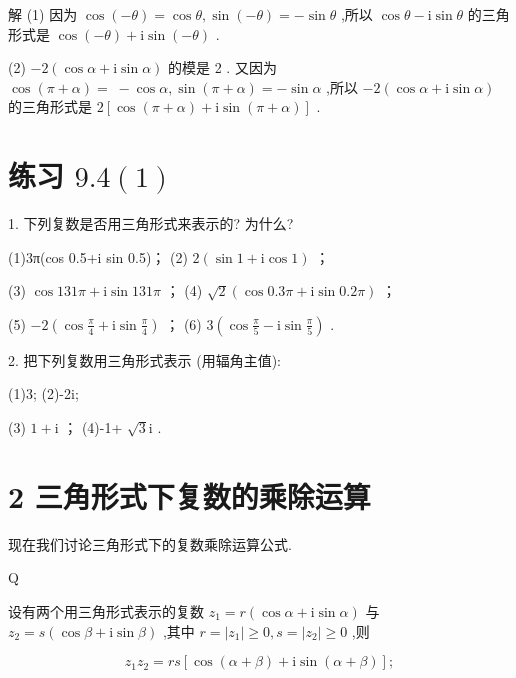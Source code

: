 \documentclass[10pt]{article}
\begin{document}
解 (1) 因为 \(\cos \left( {-\theta }\right)  = \cos \theta ,\sin \left( {-\theta }\right)  =  - \sin \theta\) ,所以 \(\cos \theta  - \mathrm{i}\sin \theta\) 的三角形式是 \(\cos \left( {-\theta }\right)  + \mathrm{i}\sin \left( {-\theta }\right)\) .

(2) \(- 2\left( {\cos \alpha  + \mathrm{i}\sin \alpha }\right)\) 的模是 2 . 又因为 \(\cos \left( {\pi  + \alpha }\right)  = \; - \cos \alpha ,\sin \left( {\pi  + \alpha }\right)  =  - \sin \alpha\) ,所以 \(- 2\left( {\cos \alpha  + \mathrm{i}\sin \alpha }\right)\) 的三角形式是 \(2\left\lbrack  {\cos \left( {\pi  + \alpha }\right)  + \mathrm{i}\sin \left( {\pi  + \alpha }\right) }\right\rbrack\) .

\section*{练习 \({9.4}\left( 1\right)\)}

1. 下列复数是否用三角形式来表示的? 为什么?

(1)3π(cos 0.5+i sin 0.5)； (2) \(2\left( {\sin 1 + \mathrm{i}\cos 1}\right)\) ；

(3) \(\cos {131\pi } + \mathrm{i}\sin {131\pi }\) ； (4) \(\sqrt{2}\left( {\cos {0.3\pi } + \mathrm{i}\sin {0.2\pi }}\right)\) ；

(5) \(- 2\left( {\cos \frac{\pi }{4} + \mathrm{i}\sin \frac{\pi }{4}}\right)\) ； (6) \(3\left( {\cos \frac{\pi }{5} - \mathrm{i}\sin \frac{\pi }{5}}\right)\) .

2. 把下列复数用三角形式表示 (用辐角主值):

(1)3; (2)-2i;

(3) \(1 + \mathrm{i}\) ； (4)-1+ \(\sqrt{3}\mathrm{i}\) .

\section*{2 三角形式下复数的乘除运算}

现在我们讨论三角形式下的复数乘除运算公式.

Q

设有两个用三角形式表示的复数 \({z}_{1} = r\left( {\cos \alpha  + \mathrm{i}\sin \alpha }\right)\) 与 \({z}_{2} = s\left( {\cos \beta  + \mathrm{i}\sin \beta }\right)\) ,其中 \(r = \left| {z}_{1}\right|  \geq  0,s = \left| {z}_{2}\right|  \geq  0\) ,则

\[
{z}_{1}{z}_{2} = {rs}\left\lbrack  {\cos \left( {\alpha  + \beta }\right)  + \mathrm{i}\sin \left( {\alpha  + \beta }\right) }\right\rbrack  ;
\]
\end{document}

